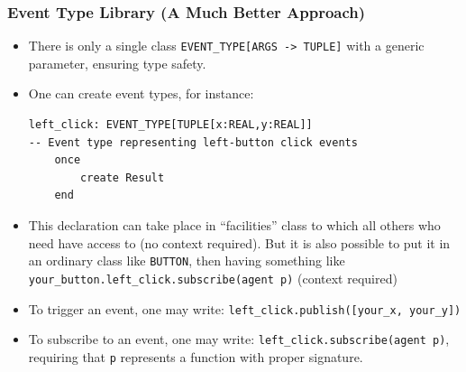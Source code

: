 \documentclass[a4paper]{article}
\newcommand{\inline}[1]{\lstinline!#1!}%
\begin{document}
\subsubsection{Event Type Library (A Much Better Approach)}
\begin{itemize}
\item There is only a single class \inline{EVENT_TYPE[ARGS -> TUPLE]} with a generic parameter, ensuring type safety. 
\item One can create event types, for instance:
\begin{lstlisting}
left_click: EVENT_TYPE[TUPLE[x:REAL,y:REAL]]
-- Event type representing left-button click events
	once
		create Result
	end
\end{lstlisting}
\item This declaration can take place in ``facilities'' class to which all others who need have access to (no context required). But it is also possible to put it in an ordinary class like \inline{BUTTON}, then having something like \inline{your_button.left_click.subscribe(agent p)} (context required)
\item To trigger an event, one may write: \inline{left_click.publish([your_x, your_y])}
\item To subscribe to an event, one may write: \inline{left_click.subscribe(agent p)}, requiring that \inline{p} represents a function with proper signature.
\end{itemize}
\end{document}
